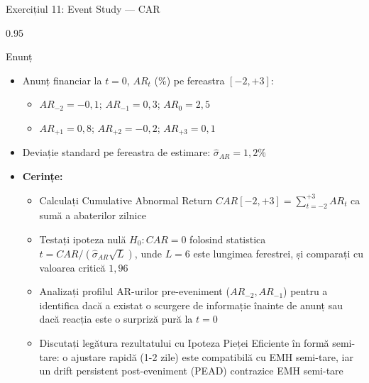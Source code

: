 \documentclass[9pt, aspectratio=169, t]{beamer}
\begin{document}
\begin{frame}[shrink=25]{Exercițiul 11: Event Study --- CAR}
\begin{cminipage}{0.95\textwidth}
\begin{block}{Enunț}
\begin{itemize}\setlength{\itemsep}{0pt}
    \item Anunț financiar la $t = 0$, $AR_t$ (\%) pe fereastra $[-2, +3]$:
    \begin{itemize}\setlength{\itemsep}{0pt}
        \item $AR_{-2} = -0{,}1$; $AR_{-1} = 0{,}3$; $AR_0 = 2{,}5$
        \item $AR_{+1} = 0{,}8$; $AR_{+2} = -0{,}2$; $AR_{+3} = 0{,}1$
    \end{itemize}
    \item Deviație standard pe fereastra de estimare: $\hat\sigma_{AR} = 1{,}2\%$
    \item \textbf{Cerințe:}
    \begin{itemize}\setlength{\itemsep}{0pt}
        \item Calculați Cumulative Abnormal Return $CAR[-2, +3] = \sum_{t=-2}^{+3} AR_t$ ca sumă a abaterilor zilnice
        \item Testați ipoteza nulă $H_0: CAR = 0$ folosind statistica $t = CAR / (\hat\sigma_{AR}\sqrt{L})$, unde $L = 6$ este lungimea ferestrei, și comparați cu valoarea critică $1{,}96$
        \item Analizați profilul AR-urilor pre-eveniment ($AR_{-2}, AR_{-1}$) pentru a identifica dacă a existat o scurgere de informație înainte de anunț sau dacă reacția este o surpriză pură la $t = 0$
        \item Discutați legătura rezultatului cu Ipoteza Pieței Eficiente în formă semi-tare: o ajustare rapidă (1-2 zile) este compatibilă cu EMH semi-tare, iar un drift persistent post-eveniment (PEAD) contrazice EMH semi-tare
    \end{itemize}
\end{itemize}
\end{block}
\end{cminipage}
\end{frame}
\end{document}
